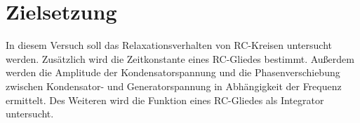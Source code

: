 \section{Zielsetzung}
In diesem Versuch soll das Relaxationsverhalten von RC-Kreisen untersucht werden.
Zusätzlich wird die Zeitkonstante eines RC-Gliedes bestimmt.
Außerdem werden die Amplitude der Kondensatorspannung
und die Phasenverschiebung zwischen Kondensator- und Generatorspannung in Abhängigkeit der Frequenz ermittelt.
Des Weiteren wird die Funktion eines RC-Gliedes als Integrator untersucht.
